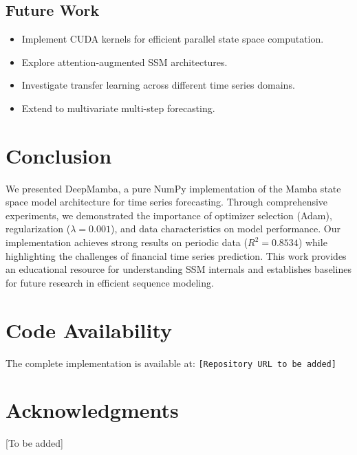 \documentclass[11pt,a4paper]{article}
\begin{document}
\subsection{Future Work}

\begin{itemize}
    \item Implement CUDA kernels for efficient parallel state space computation.
    \item Explore attention-augmented SSM architectures.
    \item Investigate transfer learning across different time series domains.
    \item Extend to multivariate multi-step forecasting.
\end{itemize}

\section{Conclusion}

We presented DeepMamba, a pure NumPy implementation of the Mamba state space model architecture for time series forecasting. Through comprehensive experiments, we demonstrated the importance of optimizer selection (Adam), regularization ($\lambda=0.001$), and data characteristics on model performance. Our implementation achieves strong results on periodic data ($R^2=0.8534$) while highlighting the challenges of financial time series prediction. This work provides an educational resource for understanding SSM internals and establishes baselines for future research in efficient sequence modeling.

\section*{Code Availability}

The complete implementation is available at: \texttt{[Repository URL to be added]}

\section*{Acknowledgments}

[To be added]
\end{document}
